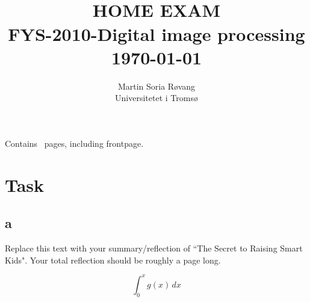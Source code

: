 
\usepackage{amssymb}
\usepackage{gensymb}
\usepackage{amsmath}


{\selectfont
\title{ \normalsize \textsc{}
		\\ [1.0cm] %
        \LARGE \textbf{\uppercase{Home Exam}
        \HRule{0.5pt} \\ [0.5cm]
        FYS-2010-Digital image processing
        \\
		\normalsize \today \vspace*{5\baselineskip}}
		}

        \date{}
\author{
		Martin Soria Røvang \\ 
        Universitetet i Tromsø \\}

\clearpage\maketitle
\vspace{0.2\textheight}
{\centering
Contains \pageref{LastPage} \, pages, including frontpage.\par
}
\thispagestyle{empty}

\newpage
\tableofcontents


\newpage

\section{Task}
\subsection{a}

Replace this text with your summary/reflection of ``The Secret to Raising Smart Kids".  Your total reflection should be roughly a page long.
 
\cite{alpaydin_2014}

\begin{equation*}
    \int_{0}^{x}g(x)\, dx
\end{equation*}


}
